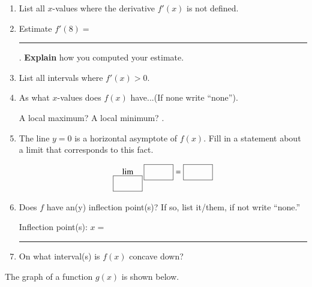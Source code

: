 \documentclass[12pt]{article}
\renewcommand{\emph}[1]{\textsf{\textbf{#1}}}
\newcommand{\blank}[1]{\rule{#1}{0.75pt}}
\let\ds\displaystyle
\newcounter{probcount}
\newcounter{subprobcount}
\def\problem#1{\setcounter{subprobcount}{0}%
\addtocounter{probcount}{1}{\emph{\arabic{probcount}.\hskip 1em(#1)}}\par}
\newenvironment{subproblems}{%
\begin{enumerate}%
\setcounter{enumi}{\value{subprobcount}}%
\renewcommand{\theenumi}{\emph{\alph{enumi}}}}%
{\setcounter{subprobcount}{\value{enumi}}\end{enumerate}}
\begin{document}
\begin{subproblems}
\item List all $x$-values where the derivative $f'(x)$ is not defined. 
\hrulefill
\item Estimate $f'(8)=$\blank{1cm}. \textbf{Explain} how you computed your estimate.

\vspace{1in}

\item List all intervals where $f'(x) >0$. \hrulefill
\item As what $x$-values does $f(x)$ have...(If none write ``none'').

 A local maximum? \hrulefill A local minimum? \hrulefill. 
 \item The line $y = 0$ is a horizontal asymptote of $f(x)$. Fill in a statement about a limit that corresponds to this fact.
 
\[\lim_{\fbox{\strut\hspace{1cm}}} \fbox{\strut\hspace{1cm}} = \fbox{\strut\hspace{1cm}}\]

 
 \item Does $f$ have an(y) inflection point(s)? If so, list it/them, if not write ``none.''
 
 Inflection point(s): $x = $ \blank{1.5 cm}
 
\item On what interval(s) is $f(x)$ concave down? \hrulefill
 \end{subproblems}

\newpage

\problem{6 points}
The graph of a function $g(x)$ is shown below.
\begin{center}
\end{center}
\end{document}
